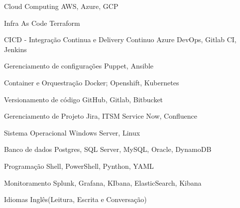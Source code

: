 

\begin{cvskills}

  \cvskill
    {Cloud Computing} %
    {AWS, Azure, GCP} %

  \cvskill
    {Infra As Code} %
    {Terraform} %

  \cvskill
    {CICD - Integração Continua e Delivery Continuo} %
    {Azure DevOps, Gitlab CI, Jenkins} %

  \cvskill
    {Gerenciamento de configurações} %
    {Puppet, Ansible} %

  \cvskill
    {Container e Orquestração} %
    {Docker; Openshift, Kubernetes} %

  \cvskill
    {Versionamento de código} %
    {GitHub, Gitlab, Bitbucket} %

  \cvskill
    {Gerenciamento de Projeto} %
    {Jira, ITSM Service Now, Confluence} %

  \cvskill
    {Sistema Operacional} %
    {Windows Server, Linux} %

  \cvskill
    {Banco de dados} %
    {Postgres, SQL Server, MySQL, Oracle, DynamoDB} %

  \cvskill
    {Programação} %
    {Shell, PowerShell, Pynthon, YAML} %

  \cvskill
    {Monitoramento} %
    {Splunk, Grafana, KIbana, ElasticSearch, Kibana} %

  \cvskill
    {Idiomas} %
    {Inglês(Leitura, Escrita e Conversação)} %

\end{cvskills}

